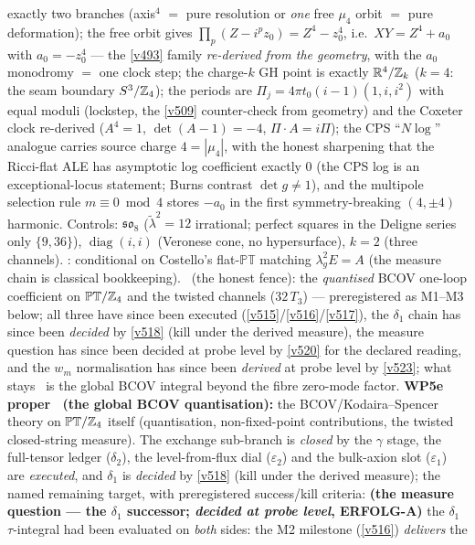 exactly two branches (axis$^4$ $=$ pure resolution or \emph{one} free $\mu_4$ orbit $=$ pure
deformation); the free orbit gives $\prod_p(Z-i^pz_0)=Z^4-z_0^4$, i.e.\ $XY=Z^4+a_0$ with
$a_0=-z_0^4$ --- the \vref{v493} family \emph{re-derived from the geometry}, with the $a_0$
monodromy $=$ one clock step; the charge-$k$ GH point is exactly $\mathbb R^4/\mathbb Z_k$ ($k=4$: the
seam boundary $S^3/\mathbb Z_4$); the periods are $\Pi_j=4\pi t_0(i-1)(1,i,i^2)$ with equal moduli
(lockstep, the \vref{v509} counter-check from geometry) and the Coxeter clock re-derived
($A^4=1$, $\det(A-1)=-4$, $\Pi\cdot A=i\Pi$); the CPS ``$N\log$'' analogue carries source charge
$4=|\mu_4|$, with the honest sharpening that the Ricci-flat ALE has asymptotic log coefficient
exactly $0$ (the CPS log is an exceptional-locus statement; Burns contrast $\det g\neq1$), and
the multipole selection rule $m\equiv0\bmod4$ stores $-a_0$ in the first symmetry-breaking
$(4,\pm4)$ harmonic. Controls: $\mathfrak{so}_8$ ($\tilde\lambda^2=12$ irrational; perfect
squares in the Deligne series only $\{9,36\}$), $\operatorname{diag}(i,i)$ (Veronese cone, no
hypersurface), $k=2$ (three channels). \mC: conditional on Costello's flat-$\mathbb{PT}$
matching $\lambda_g^2E=A$ (the measure chain is classical bookkeeping). \mO\ (the honest fence):
the \emph{quantised} BCOV one-loop coefficient on $\mathbb{PT}/\mathbb Z_4$ and the twisted channels
($32\,T_3$) --- preregistered as M1--M3 below; all three have since been executed
(\vref{v515}/\vref{v516}/\vref{v517}), the $\delta_1$ chain has since been \emph{decided}
by \vref{v518} (kill under the derived measure), the measure question has since been
decided at probe level by \vref{v520} for the declared reading, and the $w_m$ normalisation
has since been \emph{derived} at probe level by \vref{v523}; what stays \mO\ is the global
BCOV integral beyond the fibre zero-mode factor.
\textbf{WP5e proper \mO\ (the global BCOV
quantisation):} the BCOV/Kodaira--Spencer theory on $\mathbb{PT}/\mathbb Z_4$ itself (quantisation,
non-fixed-point contributions, the twisted closed-string measure). The exchange sub-branch is
\emph{closed} by the $\gamma$ stage, the full-tensor ledger ($\delta_2$), the level-from-flux
dial ($\varepsilon_2$) and the bulk-axion slot ($\varepsilon_1$) are \emph{executed}, and
$\delta_1$ is \emph{decided} by \vref{v518} (kill under the derived measure); the named
remaining target, with preregistered success/kill criteria:
\textbf{(the measure question --- the $\delta_1$ successor; \emph{decided at probe level},
ERFOLG-A)} the $\delta_1$ $\tau$-integral had
been evaluated on \emph{both} sides: the M2 milestone (\vref{v516}) \emph{delivers} the
